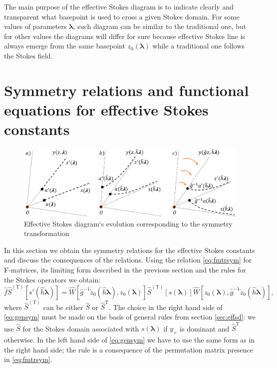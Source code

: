 \documentclass[atmp]{ipart_v1}
\def\lmbd{\bm{\lambda}}
\def\f{\hat{f}}
\def\g{\hat{g}}
\def\h{\hat{h}}
\def\S{\widehat{S}}
\def\W{\widehat{W}}
\def\T{\mathrm{T}}
\newcommand\eref[1]{\eqref{#1}}
\newcommand\sref[1]{section \ref{#1}}
\begin{document}
The main purpose of the effective Stokes diagram is to indicate clearly and transparent what
basepoint is used to cross a given Stokes domain. For some values of parameters $\lmbd$, such
diagram can be similar to the traditional one, but for other values the diagrams will differ
for sure because effective Stokes line is always emerge from the same basepoint $z_0(\lmbd)$
while a traditional one follows the Stokes field.

\section{Symmetry relations and functional equations for effective Stokes constants \label{sec:scsymm}}

\begin{figure}
\centering
\noindent
\includegraphics[width=\textwidth]{rs.png}
\caption{Effective Stokes diagram`s evolution corresponding to the symmetry transformation}
\label{fig:rst}
\end{figure}

In this section we obtain the symmetry relations for the effective Stokes constants and discuss
the consequences of the relations. Using the relation \eref{eq:fmtrsym} for F-matrices, 
its limiting form described in the previous section and the rules for the Stokes operators we obtain:
\begin{equation}
\f \S^{(\T)} \left[ s'(\h\lmbd) \right] = 
\W \left[ \g^{-1}\tilde{z}_0(\h\lmbd), z_0(\lmbd) \right]
\S^{(\T)} \left[ s(\lmbd) \right]
\W \left[ z_0(\lmbd), \g^{-1}\tilde{z}_0(\h\lmbd) \right],
\label{eq:gensym}
\end{equation}
where $\S^{(\T)}$ can be either $\S$ or $\S^{\T}$. The choice in the right hand side 
of \eref{eq:gensym} must be made on the basis of general rules from \sref{sec:effsd}: 
we use $\S$ for the Stokes domain associated with $s(\lmbd)$ if $y_+$ is dominant 
and $\S^{\T}$ otherwise. In the left hand side of \eref{eq:gensym} we have to use the 
same form as in the right hand side; the rule is a consequence of the permutation
matrix presence in \eref{eq:fmtrsym}.
\end{document}
